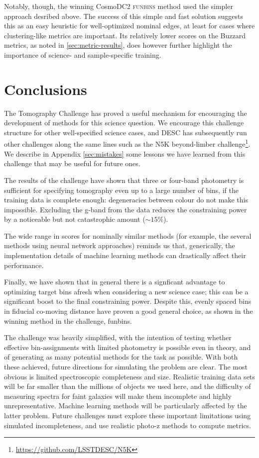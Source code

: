 \documentclass[twocolumn,twocolappendix]{aastex63}
\begin{document}
Notably, though, the winning CosmoDC2 \textsc{funbins} method used the simpler approach desribed above. The 
success of this simple and fast solution suggests this as an easy heuristic for well-optimized nominal edges, 
at least for cases where clustering-like metrics are important.  Its relatively lower
scores on the Buzzard metrics, as noted in \autoref{sec:metric-results}, does however further highlight
the importance of science- and sample-specific training.

\section{Conclusions} \label{sec:conclusion}
The Tomography Challenge has proved a useful mechanism for encouraging the development
of methods for this science question.  We encourage this challenge structure for other
well-specified science cases, and DESC has subsequently run other challenges along the same lines
such as the N5K beyond-limber challenge\footnote{\url{https://github.com/LSSTDESC/N5K}}.
We describe in Appendix \ref{sec:mistakes} some lessons we have learned from this challenge
that may be useful for future ones.

The results of the challenge have shown that three or four-band photometry
is sufficient for specifying tomography even up to a large number of bins, if
the training data is complete enough: degeneracies between colour do not make this impossible.
Excluding the g-band from the data reduces the constraining power by a noticeable but
not catastrophic amount ($\sim 15$\%).

The wide range in scores for nominally similar methods (for example, the several methods using
neural network approaches) reminds us that, generically, the implementation details of machine
learning methods can drastically affect their performance.

Finally, we have shown that in general there is a signficant advantage to optimizing
target bins afresh when considering a new science case; this can be a significant boost
to the final constraining power.
Despite this, evenly spaced bins in fiducial co-moving distance have proven
a good general choice, as shown in the winning method in the challenge, {\sc funbins}.

The challenge was heavily simplified, with the intention of testing whether
effective bin-assignments with limited photometry is possible even in theory,
and of generating as many potential methods for the task as possible.  With
both these achieved, future directions for simulating the problem are clear.
The most obvious is limited spectroscopic completeness and size.  Realistic
training data sets will be far smaller than the millions of objects we used here,
and the difficulty of measuring spectra for faint galaxies will make them
incomplete and highly unrepresentative. Machine learning methods will be particularly
affected by the latter problem.  Future challenges must explore these important limitations
using simulated incompleteness, and use realistic photo-z methods to compute metrics.
\end{document}

